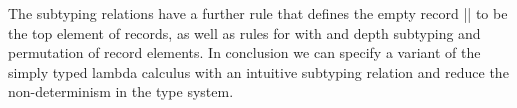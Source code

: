The subtyping relations have a further rule that defines the empty
record \code|{}| to be the top element of records, as well as rules
for with and depth subtyping and permutation of record elements. In
conclusion we can specify a variant of the simply typed lambda
calculus with an intuitive subtyping relation and reduce the
non-determinism in the type system.

